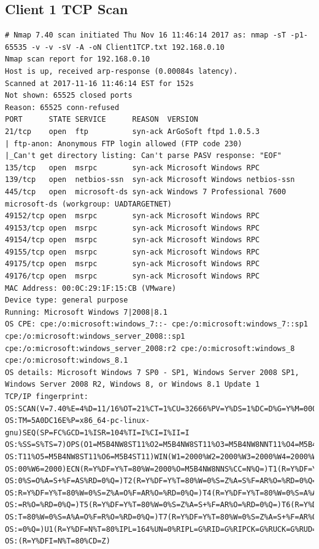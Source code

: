 \documentclass[12pt,a4paper]{article}
\begin{document}
\begin{appendices}
	\subsection{Client 1 TCP Scan}
		\begin{lstlisting}
# Nmap 7.40 scan initiated Thu Nov 16 11:46:14 2017 as: nmap -sT -p1-65535 -v -v -sV -A -oN Client1TCP.txt 192.168.0.10
Nmap scan report for 192.168.0.10
Host is up, received arp-response (0.00084s latency).
Scanned at 2017-11-16 11:46:14 EST for 152s
Not shown: 65525 closed ports
Reason: 65525 conn-refused
PORT      STATE SERVICE      REASON  VERSION
21/tcp    open  ftp          syn-ack ArGoSoft ftpd 1.0.5.3
| ftp-anon: Anonymous FTP login allowed (FTP code 230)
|_Can't get directory listing: Can't parse PASV response: "EOF"
135/tcp   open  msrpc        syn-ack Microsoft Windows RPC
139/tcp   open  netbios-ssn  syn-ack Microsoft Windows netbios-ssn
445/tcp   open  microsoft-ds syn-ack Windows 7 Professional 7600 microsoft-ds (workgroup: UADTARGETNET)
49152/tcp open  msrpc        syn-ack Microsoft Windows RPC
49153/tcp open  msrpc        syn-ack Microsoft Windows RPC
49154/tcp open  msrpc        syn-ack Microsoft Windows RPC
49155/tcp open  msrpc        syn-ack Microsoft Windows RPC
49175/tcp open  msrpc        syn-ack Microsoft Windows RPC
49176/tcp open  msrpc        syn-ack Microsoft Windows RPC
MAC Address: 00:0C:29:1F:15:CB (VMware)
Device type: general purpose
Running: Microsoft Windows 7|2008|8.1
OS CPE: cpe:/o:microsoft:windows_7::- cpe:/o:microsoft:windows_7::sp1 cpe:/o:microsoft:windows_server_2008::sp1 cpe:/o:microsoft:windows_server_2008:r2 cpe:/o:microsoft:windows_8 cpe:/o:microsoft:windows_8.1
OS details: Microsoft Windows 7 SP0 - SP1, Windows Server 2008 SP1, Windows Server 2008 R2, Windows 8, or Windows 8.1 Update 1
TCP/IP fingerprint:
OS:SCAN(V=7.40%E=4%D=11/16%OT=21%CT=1%CU=32666%PV=Y%DS=1%DC=D%G=Y%M=000C29%
OS:TM=5A0DC16E%P=x86_64-pc-linux-gnu)SEQ(SP=FC%GCD=1%ISR=104%TI=I%CI=I%II=I
OS:%SS=S%TS=7)OPS(O1=M5B4NW8ST11%O2=M5B4NW8ST11%O3=M5B4NW8NNT11%O4=M5B4NW8S
OS:T11%O5=M5B4NW8ST11%O6=M5B4ST11)WIN(W1=2000%W2=2000%W3=2000%W4=2000%W5=20
OS:00%W6=2000)ECN(R=Y%DF=Y%T=80%W=2000%O=M5B4NW8NNS%CC=N%Q=)T1(R=Y%DF=Y%T=8
OS:0%S=O%A=S+%F=AS%RD=0%Q=)T2(R=Y%DF=Y%T=80%W=0%S=Z%A=S%F=AR%O=%RD=0%Q=)T3(
OS:R=Y%DF=Y%T=80%W=0%S=Z%A=O%F=AR%O=%RD=0%Q=)T4(R=Y%DF=Y%T=80%W=0%S=A%A=O%F
OS:=R%O=%RD=0%Q=)T5(R=Y%DF=Y%T=80%W=0%S=Z%A=S+%F=AR%O=%RD=0%Q=)T6(R=Y%DF=Y%
OS:T=80%W=0%S=A%A=O%F=R%O=%RD=0%Q=)T7(R=Y%DF=Y%T=80%W=0%S=Z%A=S+%F=AR%O=%RD
OS:=0%Q=)U1(R=Y%DF=N%T=80%IPL=164%UN=0%RIPL=G%RID=G%RIPCK=G%RUCK=G%RUD=G)IE
OS:(R=Y%DFI=N%T=80%CD=Z)


\end{lstlisting}
\end{appendices}
\end{document}
